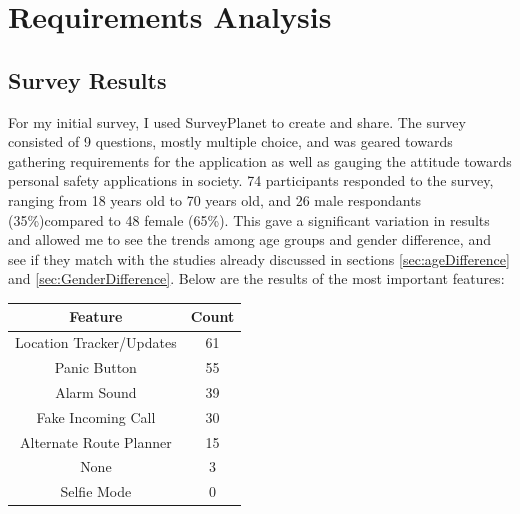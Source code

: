 \documentclass[a4paper]{report}
\begin{document}
\chapter{Requirements Analysis}
\label{sec:Requirements}
\section{Survey Results}
\label{sec:SurveyResults}
For my initial survey, I used SurveyPlanet to create and share. The survey consisted of 9 questions, mostly multiple choice, and was geared towards gathering requirements for the application as well as gauging the attitude towards personal safety applications in society. 74 participants responded to the survey, ranging from 18 years old to 70 years old, and 26 male respondants (35\%)compared to 48 female (65\%). This gave a significant variation in results and allowed me to see the trends among age groups and gender difference, and see if they match with the studies already discussed in sections \ref{sec:ageDifference} and \ref{sec:GenderDifference}. Below are the results of the most important features: 

\begin{center}
	\begin{tabular}{|c|c|}
		\hline
		Feature & Count\\
		\hline
		Location Tracker/Updates & 61 \\
		\hline
		Panic Button & 55 \\
		\hline
		Alarm Sound & 39 \\
		\hline
		Fake Incoming Call & 30 \\ 
		\hline
		Alternate Route Planner & 15 \\
		\hline
		None & 3 \\
		\hline
		Selfie Mode & 0 \\
		\hline
		
		\hline
	\end{tabular}
\end{center}
\end{document}
